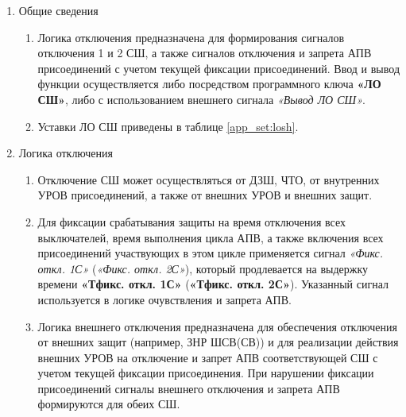 \color{black}

\begin{enumerate}

\item Общие сведения

\begin{enumerate}

\item
Логика отключения предназначена для формирования сигналов отключения 1 и 2 СШ, а также сигналов отключения и запрета АПВ присоединений с учетом текущей фиксации присоединений. Ввод и вывод функции осуществляется либо посредством программного ключа \textbf{«ЛО СШ»}, либо с использованием внешнего сигнала \textit{«Вывод ЛО СШ»}.

\item
Уставки ЛО СШ приведены в таблице \ref{app_set:losh}.  

\end{enumerate}

\item Логика отключения

\begin{enumerate}

\item
Отключение СШ может осуществляться от ДЗШ, ЧТО, от внутренних УРОВ присоединений, а также от внешних УРОВ и внешних защит.

\item
Для фиксации срабатывания защиты на время отключения всех выключателей, время выполнения цикла АПВ, а также включения всех присоединений участвующих в этом цикле применяется сигнал \textit{«Фикс. откл. 1С»} (\textit{«Фикс. откл. 2С»}), который продлевается на выдержку времени \textbf{«Тфикс. откл. 1С»} (\textbf{«Тфикс. откл. 2С»}). Указанный сигнал используется в логике очувствления и запрета АПВ.

\item
Логика внешнего отключения предназначена для обеспечения отключения от внешних защит (например, ЗНР ШСВ(СВ)) и для реализации действия внешних УРОВ на отключение и запрет АПВ соответствующей СШ с учетом текущей фиксации присоединения. При нарушении фиксации присоединений сигналы внешнего отключения и запрета АПВ формируются для обеих СШ.


\end{enumerate}
\end{enumerate}
